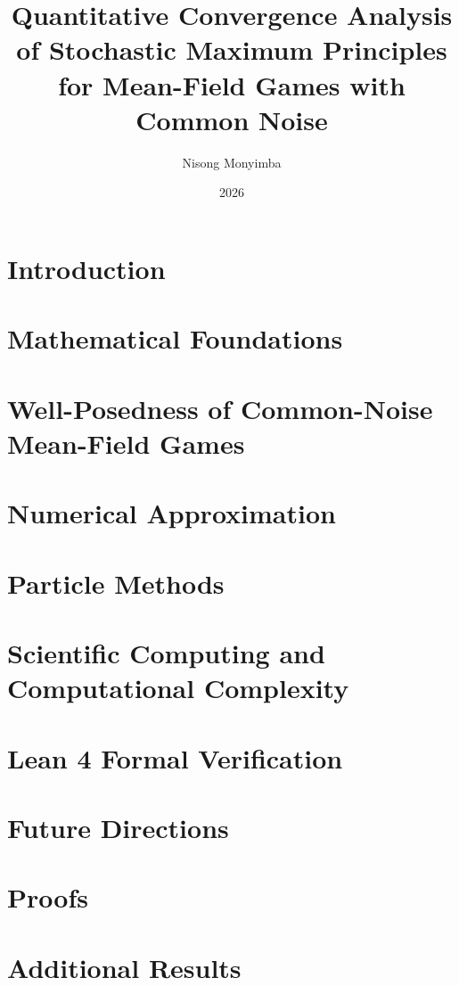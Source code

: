 \documentclass[12pt]{report}
\title{Quantitative Convergence Analysis of Stochastic Maximum Principles \\
       for Mean-Field Games with Common Noise}
\author{Nisong Monyimba}
\date{2026}
\begin{document}
\maketitle



\tableofcontents
\listoffigures
\listoftables

\chapter{Introduction}


\chapter{Mathematical Foundations}


\chapter{Well-Posedness of Common-Noise Mean-Field Games}


\chapter{Numerical Approximation}


\chapter{Particle Methods}


\chapter{Scientific Computing and Computational Complexity}


\chapter{Lean 4 Formal Verification}


\chapter{Future Directions}


\appendix
\chapter{Proofs}


\chapter{Additional Results}




\end{document}
